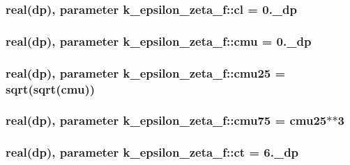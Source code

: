 \hypertarget{classk__epsilon__zeta__f_a40a3b2a1b969e48ceb6fdd23b6372ef9}{
\subsubsection[{cl}]{\setlength{\rightskip}{0pt plus 5cm}real(dp), parameter k\-\_\-epsilon\-\_\-zeta\-\_\-f\-::cl = 0.\-\_\-dp}}\label{classk__epsilon__zeta__f_a40a3b2a1b969e48ceb6fdd23b6372ef9}
\hypertarget{classk__epsilon__zeta__f_a5d567a6368bca5b0841051cd221355d4}{
\subsubsection[{cmu}]{\setlength{\rightskip}{0pt plus 5cm}real(dp), parameter k\-\_\-epsilon\-\_\-zeta\-\_\-f\-::cmu = 0.\-\_\-dp}}\label{classk__epsilon__zeta__f_a5d567a6368bca5b0841051cd221355d4}
\hypertarget{classk__epsilon__zeta__f_a308cd7b6a2275f11124688a6adf889f4}{
\subsubsection[{cmu25}]{\setlength{\rightskip}{0pt plus 5cm}real(dp), parameter k\-\_\-epsilon\-\_\-zeta\-\_\-f\-::cmu25 = sqrt(sqrt({\bf cmu}))}}\label{classk__epsilon__zeta__f_a308cd7b6a2275f11124688a6adf889f4}
\hypertarget{classk__epsilon__zeta__f_a131abf270c04c30fb509cfeb44b84083}{
\subsubsection[{cmu75}]{\setlength{\rightskip}{0pt plus 5cm}real(dp), parameter k\-\_\-epsilon\-\_\-zeta\-\_\-f\-::cmu75 = {\bf cmu25}$\ast$$\ast$3}}\label{classk__epsilon__zeta__f_a131abf270c04c30fb509cfeb44b84083}
\hypertarget{classk__epsilon__zeta__f_a54620cbb76d5c8b3260c4f8037170965}{
\subsubsection[{ct}]{\setlength{\rightskip}{0pt plus 5cm}real(dp), parameter k\-\_\-epsilon\-\_\-zeta\-\_\-f\-::ct = 6.\-\_\-dp}}\label{classk__epsilon__zeta__f_a54620cbb76d5c8b3260c4f8037170965}
